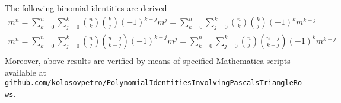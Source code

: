 The following binomial identities are derived
\begin{gather*}
    m^n
    = \sum_{k=0}^{n} \sum_{j=0}^{k} \binom{n}{k} \binom{k}{j} (-1)^{k-j} m^j
    = \sum_{k=0}^{n} \sum_{j=0}^{k} \binom{n}{k} \binom{k}{j} (-1)^{k} m^{k-j} \\
    m^n
    = \sum_{k=0}^{n} \sum_{j=0}^{k} \binom{n}{j} \binom{n-j}{k-j} (-1)^{k-j} m^j
    = \sum_{k=0}^{n} \sum_{j=0}^{k} \binom{n}{j} \binom{n-j}{k-j} (-1)^{k} m^{k-j} \\
\end{gather*}
Moreover, above results are verified by means of specified Mathematica scripts available at
\href{https://github.com/kolosovpetro/PolynomialIdentitiesInvolvingPascalsTriangleRows/blob/develop/mathematica/PolynomialIdentitiesInvolvingPascalsTriangleRows.m}
{\texttt{github.com/kolosovpetro/PolynomialIdentitiesInvolvingPascalsTriangleRows}}.
